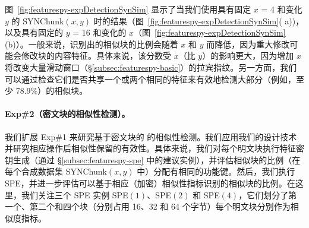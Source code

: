 图~\ref{fig:featurespy-expDetectionSynSim} 显示了当我们使用具有固定 $x$ = 4 和变化 $y$ 的 SYNChunk$(x, y)$ 时的结果（图~\ref{fig:featurespy-expDetectionSynSim}( a))，以及具有固定的 $y$ = 16 和变化的 $x$（图~\ref{fig:featurespy-expDetectionSynSim}(b)）。一般来说，识别出的相似块的比例会随着 $x$ 和 $y$ 而降低，因为重大修改可能会修改块的内容特征。具体来说，该分数受 $x$（比 $y$）的影响更大，因为增加 $x$ 将改变大量滑动窗口（\S\ref{subsec:featurespy-basic}）的拉宾指纹。另一方面，我们可以通过检查它们是否共享一个或两个相同的特征来有效地检测大部分（例如，至少 78.9\%）的相似块。



\paragraph*{Exp\#2（密文块的相似性检测）。}
我们扩展 Exp\#1 来研究基于密文块的 \sysnameF 的相似性检测。我们应用我们的设计技术并研究相应操作后相似性保留的有效性。具体来说，我们对每个明文块执行特征密钥生成（通过 \S\ref{subsec:featurespy-spe} 中的建议实例），并评估相似块的比例（在每个合成数据集 SYNChunk$(x, y)$ 中）分配有相同的功能键。然后，我们执行 SPE，并进一步评估可以基于相应（加密）相似性指标识别的相似块的比例。在这里，我们关注三个 SPE 实例 SPE$(1)$、SPE$(2)$ 和 SPE$(4)$，它们划分了第一个、第二个和四个块（分别占用 16、32 和 64 个字节）每个明文块分别作为相似度指标。

